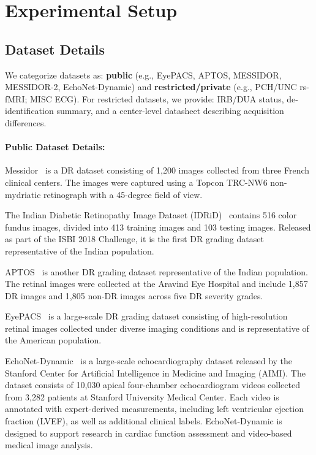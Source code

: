 \documentclass{article}
\begin{document}
\section{Experimental Setup}
\label{sec:experimental_setup}
\subsection{Dataset Details}
\label{app:dataset_details}
We categorize datasets as:
\textbf{public} (e.g., EyePACS, APTOS, MESSIDOR, MESSIDOR-2, EchoNet-Dynamic) and
\textbf{restricted/private} (e.g., PCH/UNC rs-fMRI; MISC ECG).
For restricted datasets, we provide: IRB/DUA status, de-identification summary, and a center-level datasheet describing acquisition differences.
\paragraph{Public Dataset Details:}
Messidor~\cite{Abramoff2016Messidor} is a DR dataset consisting of 1,200 images
collected from three French clinical centers. The images were captured using a
Topcon TRC-NW6 non-mydriatic retinograph with a 45-degree field of view.

The Indian Diabetic Retinopathy Image Dataset (IDRiD)~\cite{Porwal2018IDRiD}
contains 516 color fundus images, divided into 413 training images and 103 testing
images. Released as part of the ISBI 2018 Challenge, it is the first DR grading
dataset representative of the Indian population.

APTOS~\cite{APTOS2019} is another DR grading dataset representative of the Indian
population. The retinal images were collected at the Aravind Eye Hospital and
include 1,857 DR images and 1,805 non-DR images across five DR severity grades.

EyePACS~\cite{EyePACS2023} is a large-scale DR grading dataset consisting of
high-resolution retinal images collected under diverse imaging conditions and is
representative of the American population.

EchoNet-Dynamic~\cite{echonetdataset} is a large-scale echocardiography
dataset released by the Stanford Center for Artificial Intelligence in Medicine
and Imaging (AIMI). The dataset consists of 10,030 apical four-chamber
echocardiogram videos collected from 3,282 patients at Stanford University
Medical Center. Each video is annotated with expert-derived measurements,
including left ventricular ejection fraction (LVEF), as well as additional
clinical labels. EchoNet-Dynamic is designed to support research in cardiac
function assessment and video-based medical image analysis.
\end{document}
